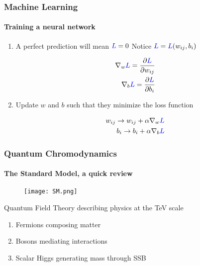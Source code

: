 \documentclass[aspectratio=43]{beamer}
\begin{document}
\begin{frame}

	\frametitle{Machine Learning}
	\framesubtitle{Training a neural network}
	
	\begin{enumerate}
		
		\item A perfect prediction will mean ${\color{blue}L} = 0$ Notice ${\color{blue}L} = {\color{blue}L}(w_{ij}, b_{i})$
		
		\begin{align}
			\nabla_{w} {\color{blue}L} = \frac{\partial {\color{blue}L}}{\partial w_{ij}}  \nonumber \\
			\nabla_{b} {\color{blue}L} = \frac{\partial {\color{blue}L}}{\partial b_{i}} \nonumber
		\end{align}
		
		\item Update $w$ and $b$ such that they minimize the loss function
		
		\begin{align}
			w_{ij} \rightarrow w_{ij} + \alpha \nabla_{w} {\color{blue}L} \nonumber \\
			b_{i} \rightarrow b_{i} + \alpha \nabla_{b} {\color{blue}L} \nonumber
		\end{align}
		
	\end{enumerate}

\end{frame}

\begin{frame}
	

\end{frame}

\begin{frame}

	\frametitle{Quantum Chromodynamics}
	\framesubtitle{The Standard Model, a quick review}

	\begin{figure}
		\texttt{[image: SM.png]}
	\end{figure}
	
	Quantum Field Theory describing physics at the TeV scale
	\begin{enumerate}
		\item Fermions composing matter
		\item Bosons mediating interactions
		\item Scalar Higgs generating mass through SSB
	\end{enumerate}
	
\end{frame}
\end{document}
